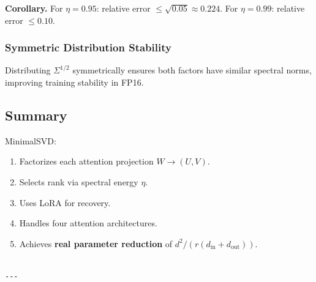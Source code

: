\textbf{Corollary.} For $\eta = 0.95$: relative error $\leq \sqrt{0.05} \approx 0.224$. 
For $\eta = 0.99$: relative error $\leq 0.10$.

\subsubsection{Symmetric Distribution Stability}

Distributing $\Sigma^{1/2}$ symmetrically ensures both factors have similar 
spectral norms, improving training stability in FP16.

\subsection{Summary}

MinimalSVD:
\begin{enumerate}
\item Factorizes each attention projection $W \to (U, V)$.
\item Selects rank via spectral energy $\eta$.
\item Uses LoRA for recovery.
\item Handles four attention architectures.
\item Achieves \textbf{real parameter reduction} of $d^2 / (r(d_\text{in} + d_\text{out}))$.
\end{enumerate}
\begin{lstlisting}

---
\end{lstlisting}